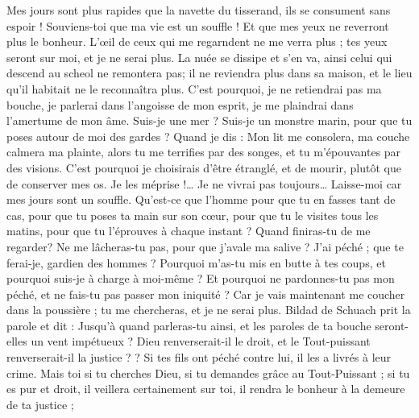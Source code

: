 \begin{multicols}{2}
Mes jours sont plus rapides que la navette du tisserand, ils se consument sans espoir !
Souviens-toi que ma vie est un souffle ! Et que mes yeux ne reverront plus le bonheur.
L'œil de ceux qui me regarndent ne me verra plus ; tes yeux seront sur moi, et je ne serai plus.
La nuée se dissipe et s'en va, ainsi celui qui descend au scheol ne remontera pas;
il ne reviendra plus dans sa maison, et le lieu qu'il habitait ne le reconnaîtra plus.
C'est pourquoi, je ne retiendrai pas ma bouche, je parlerai dans l'angoisse de mon esprit, je me plaindrai dans l'amertume de mon âme.
Suis-je une mer ? Suis-je un monstre marin, pour que tu poses autour de moi des gardes ?
Quand je dis : Mon lit me consolera, ma couche calmera ma plainte,
alors tu me terrifies par des songes, et tu m'épouvantes par des visions.
C'est pourquoi je choisirais d'être étranglé, et de mourir, plutôt que de conserver mes os.
Je les méprise !… Je ne vivrai pas toujours… Laisse-moi car mes jours sont un souffle.
Qu'est-ce que l'homme pour que tu en fasses tant de cas, pour que tu poses ta main sur son cœur,
pour que tu le visites tous les matins, pour que tu l'éprouves à chaque instant ?
Quand finiras-tu de me regarder? Ne me lâcheras-tu pas, pour que j'avale ma salive ?
J'ai péché ; que te ferai-je, gardien des hommes ?    Pourquoi m'as-tu mis en butte à tes coups, et pourquoi suis-je à charge à moi-même ?
Et pourquoi ne pardonnes-tu pas mon péché, et ne fais-tu pas passer mon iniquité ? Car je vais maintenant me coucher dans la poussière ; tu me chercheras, et je ne serai plus.
\VerseOne{}Bildad de Schuach prit la parole et dit :
Jusqu'à quand parleras-tu ainsi, et les paroles de ta bouche seront-elles un vent impétueux ?
Dieu renverserait-il le droit, et le Tout-puissant renverserait-il la justice ?  ?
Si tes fils ont péché contre lui, il les a livrés à leur crime.
Mais toi si tu cherches Dieu, si tu demandes grâce au Tout-Puissant ;
si tu es pur et droit, il veillera certainement sur toi, il rendra le bonheur à la demeure de ta justice ;

\end{multicols}
